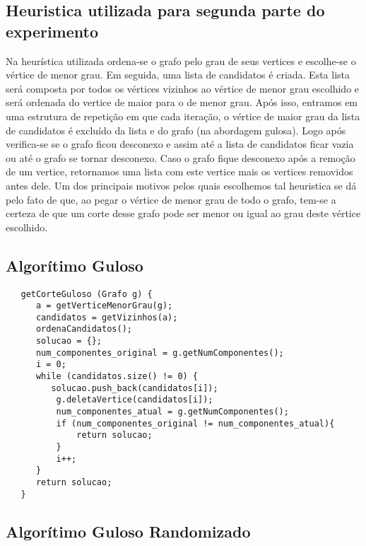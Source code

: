 \documentclass[a4paper, 12pt]{article}
\begin{document}
\subsection{Heuristica utilizada para segunda parte do experimento}
Na heurística utilizada ordena-se o grafo pelo grau de seus vertices e escolhe-se o vértice de menor grau. Em seguida, uma lista de candidatos é criada. Esta lista será composta por todos os vértices vizinhos ao vértice de menor grau escolhido e será ordenada do vertice de maior para o de menor grau. Após isso, entramos em uma estrutura de repetição em que cada iteração, o vértice de maior grau da lista de candidatos é excluído da lista e do grafo (na abordagem gulosa). Logo após verifica-se se o grafo ficou desconexo e assim até a lista de candidatos ficar vazia ou até o grafo se tornar desconexo. Caso o grafo fique desconexo após a remoção de um vertice, retornamos uma lista com este vertice mais os vertices removidos antes dele. Um dos principais motivos pelos quais escolhemos tal heuristica se dá pelo fato de que, ao pegar o vértice de menor grau de todo o grafo, tem-se a certeza de que um corte desse grafo pode ser menor ou igual ao grau deste vértice escolhido.

\subsection{Algorítimo Guloso}
 
 \begin{lstlisting} 
   getCorteGuloso (Grafo g) {
      a = getVerticeMenorGrau(g); 
      candidatos = getVizinhos(a); 
      ordenaCandidatos();
      solucao = {};
      num_componentes_original = g.getNumComponentes(); 
      i = 0;
      while (candidatos.size() != 0) {
         solucao.push_back(candidatos[i]);
          g.deletaVertice(candidatos[i]);
          num_componentes_atual = g.getNumComponentes(); 
          if (num_componentes_original != num_componentes_atual){
              return solucao;
          }
          i++;
      }
      return solucao;
   }
 \end{lstlisting}

\subsection{Algorítimo Guloso Randomizado}
\end{document}
